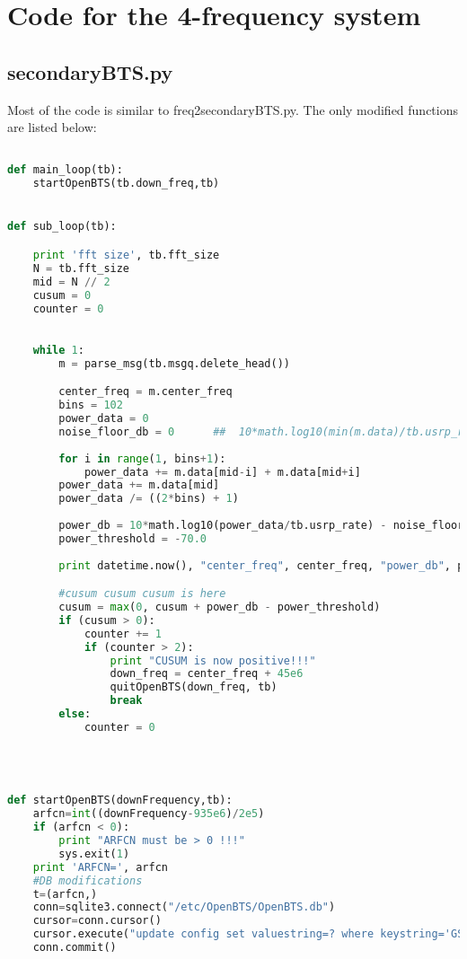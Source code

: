 \section{Code for the 4-frequency system}
\subsection{secondaryBTS.py}

Most of the code is similar to \textsf{freq2secondaryBTS.py}. The only modified 
functions are listed below:

\begin{lstlisting}[language=Python]

def main_loop(tb):
    startOpenBTS(tb.down_freq,tb)


def sub_loop(tb):

    print 'fft size', tb.fft_size
    N = tb.fft_size
    mid = N // 2
    cusum = 0
    counter = 0
    

    while 1:
        m = parse_msg(tb.msgq.delete_head())

        center_freq = m.center_freq
        bins = 102
        power_data = 0
        noise_floor_db = 0      ##  10*math.log10(min(m.data)/tb.usrp_rate)
        
        for i in range(1, bins+1):
            power_data += m.data[mid-i] + m.data[mid+i]
        power_data += m.data[mid]
        power_data /= ((2*bins) + 1)
        
        power_db = 10*math.log10(power_data/tb.usrp_rate) - noise_floor_db
        power_threshold = -70.0
        
        print datetime.now(), "center_freq", center_freq, "power_db", power_db

        #cusum cusum cusum is here
        cusum = max(0, cusum + power_db - power_threshold)
        if (cusum > 0):
            counter += 1
            if (counter > 2):
                print "CUSUM is now positive!!!"
                down_freq = center_freq + 45e6
                quitOpenBTS(down_freq, tb)
                break
        else:
            counter = 0




def startOpenBTS(downFrequency,tb):
    arfcn=int((downFrequency-935e6)/2e5)
    if (arfcn < 0):
        print "ARFCN must be > 0 !!!"
        sys.exit(1)
    print 'ARFCN=', arfcn
    #DB modifications
    t=(arfcn,)
    conn=sqlite3.connect("/etc/OpenBTS/OpenBTS.db")
    cursor=conn.cursor()
    cursor.execute("update config set valuestring=? where keystring='GSM.Radio.C0'",t)
    conn.commit()


\end{lstlisting}
